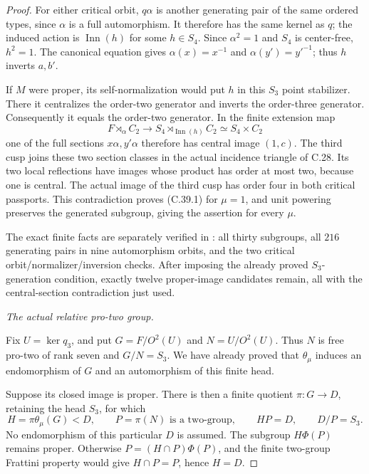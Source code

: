 \begin{proof}
For either critical orbit, \(q\alpha\) is another generating
pair of the same ordered types, since \(\alpha\) is a full
automorphism. It therefore has the same kernel as \(q\);
the induced action is \(\operatorname{Inn}(h)\) for some
\(h\in S_4\). Since \(\alpha^2=1\) and \(S_4\) is
center-free, \(h^2=1\). The canonical equation gives
\(\alpha(x)=x^{-1}\) and \(\alpha(y')=y'^{-1}\);
thus \(h\) inverts \(a,b'\).

If \(M\) were proper, its self-normalization would put
\(h\) in this \(S_3\) point stabilizer. There it
centralizes the order-two generator and inverts the
order-three generator. Consequently it equals the
order-two generator. In the finite extension map
\[
 F\rtimes_\alpha C_2\longrightarrow
 S_4\rtimes_{\operatorname{Inn}(h)}C_2
                   \simeq S_4\times C_2
\]
one of the full sections \(x\alpha,y'\alpha\) therefore
has central image \((1,c)\). The third cusp joins these
two section classes in the actual incidence triangle
of C.28. Its two local reflections have images whose
product has order at most two, because one is central.
The actual image of the third cusp has order four in
both critical passports. This contradiction proves
(C.39.1) for \(\mu=1\), and unit powering preserves the
generated subgroup, giving the assertion for every \(\mu\).

The exact finite facts are separately verified in
: all thirty subgroups,
all \(216\) generating pairs in nine automorphism orbits,
and the two critical orbit/normalizer/inversion checks.
After imposing the already proved \(S_3\)-generation
condition, exactly twelve proper-image candidates remain,
all with the central-section contradiction just used.

\emph{The actual relative pro-two group.}\par
Fix \(U=\ker q_3\), and put \(G=F/O^2(U)\) and
\(N=U/O^2(U)\). Thus \(N\) is free pro-two of rank
seven and \(G/N=S_3\). We have already proved that
\(\theta_\mu\) induces an endomorphism of \(G\) and
an automorphism of this finite head.

Suppose its closed image is proper. There is then a
finite quotient \(\pi:G\to D\), retaining the head
\(S_3\), for which
\[
 H=\pi\theta_\mu(G)<D,\qquad P=\pi(N)\text{ is a two-group},
 \qquad HP=D,\qquad D/P=S_3.
\]
No endomorphism of this particular \(D\) is assumed.
The subgroup \(H\Phi(P)\) remains proper. Otherwise
\(P=(H\cap P)\Phi(P)\), and the finite two-group
Frattini property would give \(H\cap P=P\), hence
\(H=D\).


\end{proof}
